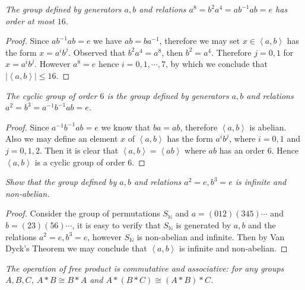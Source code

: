 \begin{problem}\em
The group defined by generators $a,b$ and relations $a^8=b^2a^4=ab^{-1}ab=e$ has order at most $16$.
\end{problem}
\begin{proof}
Since $ab^{-1}ab=e$ we have $ab=ba^{-1}$, therefore we may set $x\in\left<a,b\right>$ has the form $x=a^ib^j$. Observed that $b^2a^4=a^8$, then $b^2=a^4$. Therefore $j=0,1$ for $x=a^ib^j$. However $a^8=e$ hence $i=0,1,\cdots,7$, by which we conclude that $|\left<a,b\right>|\le 16$.
\end{proof}
\begin{problem}\em
The cyclic group of order $6$ is the group defined by generators $a,b$ and relations $a^2=b^3=a^{-1}b^{-1}ab=e$.
\end{problem}
\begin{proof}
Since $a^{-1}b^{-1}ab=e$ we know that $ba=ab$, therefore $\left<a,b\right>$ is abelian. Also we may define an element $x$ of $\left<a,b\right>$ has the form $a^ib^j$, where $i=0,1$ and $j=0,1,2$. Then it is clear that $\left<a,b\right>=\left<ab\right>$ where $ab$ has an order $6$. Hence $\left<a,b\right>$ is a cyclic group of order $6$. 
\end{proof}
\begin{problem}\em
Show that the group defined by $a,b$ and relations $a^2=e, b^3=e$ is infinite and non-abelian.
\end{problem}
\begin{proof}
Consider the group of permutations $S_\mathbb{N}$ and $a=(012)(345)\cdots$ and $b=(23)(56)\cdots$, it is easy to verify that $S_\mathbb{N}$ is generated by $a,b$ and the relations $a^2=e, b^3=e$, however $S_\mathbb{N}$ is non-abelian and infinite. Then by Van Dyck's Theorem we may conclude that $\left<a,b\right>$ is infinite and non-abelian.
\end{proof}
\begin{problem}\em
The operation of free product is commutative and associative: for any groups $A,B,C$, $A*B\cong B*A$ and $A*(B*C)\cong(A*B)*C$.
\end{problem}
